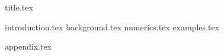 \documentclass[12pt,a4paper,twoside]{article}
\begin{document}
{title.tex}

\newpage
\tableofcontents
\newpage

\pagestyle{headings}
\raggedbottom

\FloatBarrier

{introduction.tex}
{background.tex}
{numerics.tex}
{examples.tex}

\nocite{*}
\printbibliography
\newpage

{appendix.tex}
\end{document}
